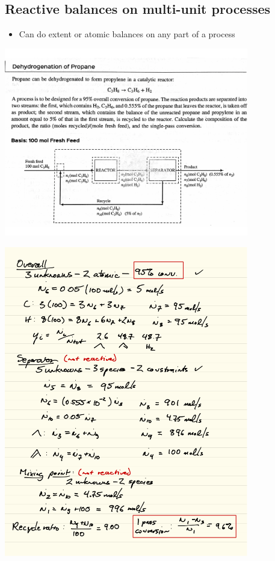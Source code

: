 \documentclass[11pt]{article}
\begin{document}
\subsection{Reactive balances on multi-unit processes}
\label{sec-6-6}
\begin{itemize}
\item Can do extent or atomic balances on any part of a process
\end{itemize}

\includegraphics[width=0.8\textwidth]{./figs/Example472.png}

\includegraphics[width=0.8\textwidth]{./figs/ReactiveRecycle.png}
\end{document}
